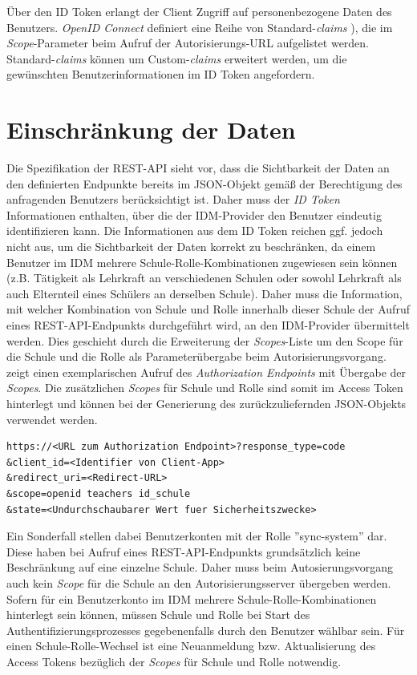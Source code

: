 Über den ID Token erlangt der Client Zugriff auf personenbezogene Daten des Benutzers. 
\textit{OpenID Connect} definiert eine Reihe von Standard-\textit{claims} \cite[Abschnitt~StandardClaims]{OpenID.Core}), die im \textit{Scope}-Parameter beim Aufruf der Autorisierungs-URL aufgelistet werden. 
Standard-\textit{claims} können um Custom-\textit{claims} erweitert werden, um die gewünschten Benutzerinformationen im ID Token angefordern.

\section{Einschränkung der Daten}
\label{auth:limit_data}

Die Spezifikation der REST-API sieht vor, dass die Sichtbarkeit der Daten an den definierten Endpunkte bereits im JSON-Objekt gemäß der Berechtigung des anfragenden Benutzers berücksichtigt ist. 
Daher muss der \textit{ID Token} Informationen enthalten, über die der IDM-Provider den Benutzer eindeutig identifizieren kann.
Die Informationen aus dem ID Token reichen ggf. jedoch nicht aus, um die Sichtbarkeit der Daten korrekt zu beschränken, da einem Benutzer im IDM mehrere Schule-Rolle-Kombinationen zugewiesen sein können (z.B. Tätigkeit als Lehrkraft an verschiedenen Schulen oder sowohl Lehrkraft als auch Elternteil eines Schülers an derselben Schule). 
Daher muss die Information, mit welcher Kombination von Schule und Rolle innerhalb dieser Schule der Aufruf eines REST-API-Endpunkts durchgeführt wird, an den IDM-Provider übermittelt werden. 
Dies geschieht durch die Erweiterung der \textit{Scopes}-Liste um den Scope für die Schule und die Rolle als Parameterübergabe beim Autorisierungsvorgang. 
 zeigt einen exemplarischen Aufruf des \textit{Authorization Endpoints} mit Übergabe der \textit{Scopes}.
Die zusätzlichen \textit{Scopes} für Schule und Rolle sind somit im Access Token hinterlegt und können bei der Generierung des zurückzuliefernden JSON-Objekts verwendet werden.

\begin{lstlisting}[caption={Beispielhafter Aufruf des Authorization Endpoints},label={listing:authorization_request},frame=tlrb]
https://<URL zum Authorization Endpoint>?response_type=code
&client_id=<Identifier von Client-App>
&redirect_uri=<Redirect-URL>
&scope=openid teachers id_schule
&state=<Undurchschaubarer Wert fuer Sicherheitszwecke>
\end{lstlisting}

Ein Sonderfall stellen dabei Benutzerkonten mit der Rolle ''sync-system'' dar. 
Diese haben bei Aufruf eines REST-API-Endpunkts grundsätzlich keine Beschränkung auf eine einzelne Schule. 
Daher muss beim Autosierungsvorgang auch kein \textit{Scope} für die Schule an den Autorisierungsserver übergeben werden. \\

Sofern für ein Benutzerkonto im IDM mehrere Schule-Rolle-Kombinationen hinterlegt sein können, müssen Schule und Rolle bei Start des Authentifizierungsprozesses gegebenenfalls durch den Benutzer wählbar sein. 
Für einen Schule-Rolle-Wechsel ist eine Neuanmeldung bzw. Aktualisierung des Access Tokens bezüglich der \textit{Scopes} für Schule und Rolle notwendig.